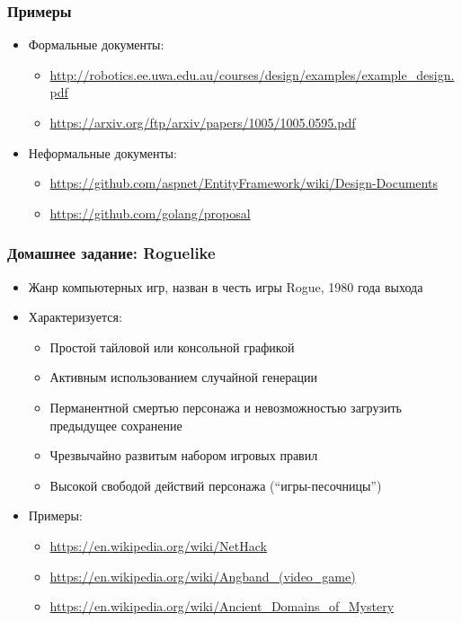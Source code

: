 \documentclass[xetex,mathserif,serif]{beamer}
\begin{document}
	\begin{frame}
		\frametitle{Примеры}
		\begin{itemize}
			\item Формальные документы:
			\begin{itemize}
				\item \url{http://robotics.ee.uwa.edu.au/courses/design/examples/example_design.pdf}
				\item \url{https://arxiv.org/ftp/arxiv/papers/1005/1005.0595.pdf}
			\end{itemize}
			\item Неформальные документы:
			\begin{itemize}
				\item \url{https://github.com/aspnet/EntityFramework/wiki/Design-Documents}
				\item \url{https://github.com/golang/proposal}
			\end{itemize}
		\end{itemize}
	\end{frame}

	\begin{frame}
		\frametitle{Домашнее задание: Roguelike}
		\begin{itemize}
			\item Жанр компьютерных игр, назван в честь игры Rogue, 1980 года выхода
			\item Характеризуется:
			\begin{itemize}
				\item Простой тайловой или консольной графикой
				\item Активным использованием случайной генерации
				\item Перманентной смертью персонажа и невозможностью загрузить предыдущее сохранение
				\item Чрезвычайно развитым набором игровых правил
				\item Высокой свободой действий персонажа (``игры-песочницы'')
			\end{itemize}
			\item Примеры:
			\begin{itemize}
				\item \url{https://en.wikipedia.org/wiki/NetHack}
				\item \url{https://en.wikipedia.org/wiki/Angband_(video_game)}
				\item \url{https://en.wikipedia.org/wiki/Ancient_Domains_of_Mystery}
			\end{itemize}
		\end{itemize}
	\end{frame}
\end{document}

